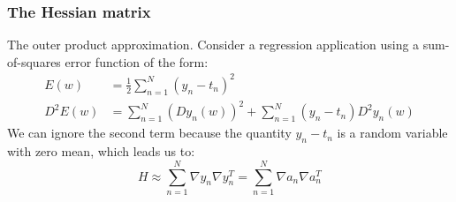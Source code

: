 \documentclass{beamer}
\begin{document}
\begin{frame}
    \frametitle{The Hessian matrix}
    The outer product approximation. Consider a regression application using a sum-of-squares error function of the form:
    \begin{align*}
        E(w)&=\frac{1}{2}\sum_{n=1}^{N}(y_{n}-t_{n})^{2} \\
        D^{2}E(w)&=\sum_{n=1}^{N}(Dy_{n}(w))^{2}+\sum_{n=1}^{N}(y_{n}-t_{n})D^{2}y_{n}(w)
    \end{align*}
    We can ignore the second term because the quantity $y_{n}-t_{n}$ is a random variable with zero mean, which leads us to:
    \begin{equation*}
        H\approx\sum_{n=1}^{N}\nabla{}y_{n}\nabla{}y_{n}^{T}=\sum_{n=1}^{N}\nabla{}a_{n}\nabla{}a_{n}^{T}
    \end{equation*}
\end{frame}
\end{document}
